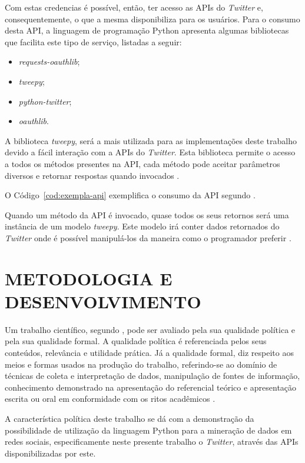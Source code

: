 Com estas credencias é possível, então, ter acesso as APIs do \textit{Twitter} e, consequentemente, o que a mesma disponibiliza para os usuários. Para o consumo desta API, a linguagem de programação Python apresenta algumas bibliotecas que facilita este tipo de serviço, listadas a seguir:

\begin{itemize}
	\item \textit{requests-oauthlib};
	\item \textit{tweepy};
	\item \textit{python-twitter};
	\item \textit{oauthlib}.
\end{itemize}

A biblioteca \textit{tweepy}, será a mais utilizada para as implementações deste trabalho devido a fácil interação com a APIs do \textit{Twitter}. Esta biblioteca permite o acesso a todos os métodos presentes na API, cada método pode aceitar parâmetros diversos e retornar respostas quando invocados \cite{tweepy}.

O Código~\ref{cod:exempla-api} exemplifica o consumo da API segundo .



Quando um método da API é invocado, quase todos os seus retornos será uma instância de um modelo \textit{tweepy}. Este modelo irá conter dados retornados do \textit{Twitter} onde é possível manipulá-los da maneira como o programador preferir \cite{tweepy}.


\section{METODOLOGIA E DESENVOLVIMENTO}\label{sec: metodologia}
Um trabalho científico, segundo , pode ser avaliado pela sua qualidade política e pela sua qualidade formal. A qualidade política é referenciada pelos seus conteúdos, relevância e utilidade prática. Já a qualidade formal, diz respeito aos meios e formas usados na produção do trabalho, referindo-se ao domínio de técnicas de coleta e interpretação de dados, manipulação de fontes de informação, conhecimento demonstrado na apresentação do referencial teórico e apresentação escrita ou oral em conformidade com os ritos acadêmicos \cite{metodologia}.

A característica política deste trabalho se dá com a demonstração da possibilidade de utilização da linguagem Python para a mineração de dados em redes sociais, especificamente neste presente trabalho o \textit{Twitter}, através das APIs disponibilizadas por este.

